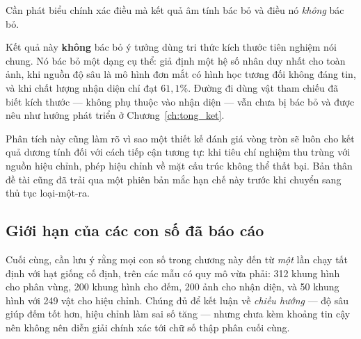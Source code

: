 Cần phát biểu chính xác điều mà kết quả âm tính bác bỏ và điều nó \emph{không} bác bỏ.

Kết quả này \textbf{không} bác bỏ ý tưởng dùng tri thức kích thước tiên nghiệm nói chung. Nó bác
bỏ một dạng cụ thể: giả định một hệ số nhân duy nhất cho toàn ảnh, khi nguồn độ sâu là mô hình
đơn mắt có hình học tương đối không đáng tin, và khi chất lượng nhận diện chỉ đạt $61{,}1\%$.
Đường đi dùng vật tham chiếu đã biết kích thước --- không phụ thuộc vào nhận diện --- vẫn chưa
bị bác bỏ và được nêu như hướng phát triển ở Chương~\ref{ch:tong_ket}.

Phân tích này cũng làm rõ vì sao một thiết kế đánh giá vòng tròn sẽ luôn cho kết quả dương tính đối với cách tiếp cận tương tự: khi tiêu chí nghiệm thu trùng với nguồn hiệu chỉnh, phép hiệu chỉnh về mặt cấu trúc không thể thất bại. Bản thân đề tài cũng đã trải qua một phiên bản mắc hạn chế này trước khi chuyển sang thủ tục loại-một-ra.

\subsection{Giới hạn của các con số đã báo cáo}

Cuối cùng, cần lưu ý rằng mọi con số trong chương này đến từ \emph{một} lần chạy tất định với
hạt giống cố định, trên các mẫu có quy mô vừa phải: 312 khung hình cho phân vùng, 200 khung hình
cho đếm, 200 ảnh cho nhận diện, và 50 khung hình với 249 vật cho hiệu chỉnh. Chúng đủ để kết
luận về \emph{chiều hướng} --- độ sâu giúp đếm tốt hơn, hiệu chỉnh làm sai số tăng --- nhưng
chưa kèm khoảng tin cậy nên không nên diễn giải chính xác tới chữ số thập phân cuối cùng.
